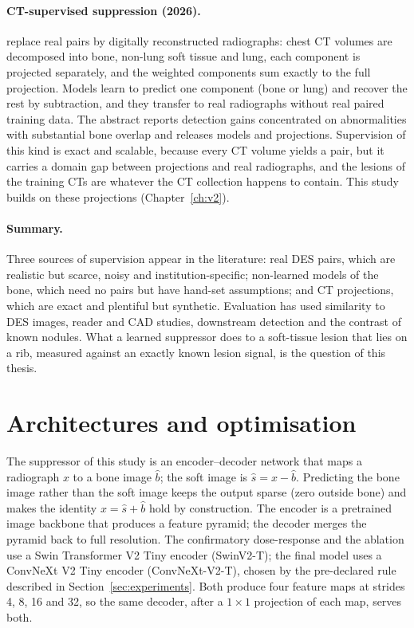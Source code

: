 \paragraph{CT-supervised suppression (2026).} \citet{angaitkar2026anatomy} replace real pairs by digitally reconstructed radiographs: chest CT
volumes are decomposed into bone, non-lung soft tissue and lung, each component is projected separately, and the weighted components sum exactly
to the full projection. Models learn to predict one component (bone or lung) and recover the rest by subtraction, and they transfer to real
radiographs without real paired training data. The abstract reports detection gains concentrated on abnormalities with substantial bone overlap and
releases models and projections. Supervision of this kind is exact and scalable, because every CT volume yields a pair, but it carries a domain gap
between projections and real radiographs, and the lesions of the training CTs are whatever the CT collection happens to contain. This study builds
on these projections (Chapter~\ref{ch:v2}).

\paragraph{Summary.} Three sources of supervision appear in the literature: real DES pairs, which are realistic but scarce, noisy and
institution-specific; non-learned models of the bone, which need no pairs but have hand-set assumptions; and CT projections, which are exact and
plentiful but synthetic. Evaluation has used similarity to DES images, reader and CAD studies, downstream detection and the contrast of known
nodules. What a learned suppressor does to a soft-tissue lesion that lies on a rib, measured against an exactly known lesion signal, is the
question of this thesis.

\section{Architectures and optimisation}
\label{sec:bg_arch}
The suppressor of this study is an encoder--decoder network that maps a radiograph $x$ to a bone image $\hat b$; the soft image is
$\hat s=x-\hat b$. Predicting the bone image rather than the soft image keeps the output sparse (zero outside bone) and makes the identity
$x=\hat s+\hat b$ hold by construction. The encoder is a pretrained image backbone that produces a feature pyramid; the decoder merges the pyramid
back to full resolution. The confirmatory dose-response and the ablation use a Swin Transformer V2 Tiny encoder (SwinV2-T); the final model uses a
ConvNeXt V2 Tiny encoder (ConvNeXt-V2-T), chosen by the pre-declared rule described in Section~\ref{sec:experiments}. Both produce four feature maps
at strides 4, 8, 16 and 32, so the same decoder, after a $1\times1$ projection of each map, serves both.

